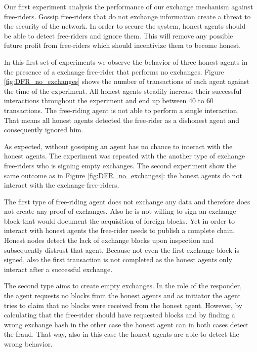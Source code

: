 Our first experiment analysis the performance of our exchange mechanism against free-riders. Gossip
free-riders that do not exchange information create a threat to the security of the network. In order
to secure the system, honest agents should be able to detect free-riders and ignore them. This will 
remove any possible future profit from free-riders which should incentivize them to become honest.

In this first set of experiments we observe the behavior of three honest agents in the presence of 
a exchange free-rider that performs no exchanges. Figure \ref{fig:DFR_no_exchanges} shows the number of transactions of each 
agent against the time of the experiment. All honest agents steadily increase their successful 
interactions throughout the experiment and end up between 40 to 60 transactions. The free-riding agent
is not able to perform a single interaction. That means all honest agents detected the free-rider 
as a dishonest agent and consequently ignored him. 

As expected, without gossiping an agent has no chance to interact with the honest agents. The 
experiment was repeated with the another type of exchange free-riders who is signing empty exchanges. 
The second experiment show the same outcome as in Figure \ref{fig:DFR_no_exchanges}:
the honest agents do not interact with the exchange free-riders.

The first type of free-riding agent does not exchange any data and therefore does not create any 
proof of exchanges. Also he is not willing to sign an exchange block that would document the acquisition
of foreign blocks. Yet in order to interact with honest agents the free-rider needs 
to publish a complete chain. Honest nodes detect the lack of exchange blocks upon inspection and 
subsequently distrust that agent. Because not even the first exchange block is signed, also the first
transaction is not completed as the honest agents only interact after a successful exchange.

The second type aims to create empty exchanges. In the role of the responder, the agent requests no 
blocks from the honest agents and as initiator the agent tries to claim that no blocks were received 
from the honest agent. However, by calculating 
that the free-rider should have requested blocks and by finding a wrong exchange hash in the other case
the honest agent can in both cases detect the fraud. That way, also in this case the honest agents 
are able to detect the wrong behavior.

